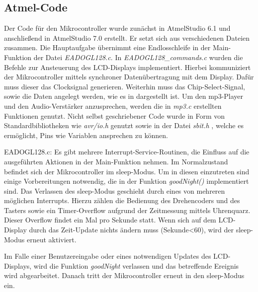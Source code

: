 \documentclass[journal, a4paper]{IEEEtran}
\begin{document}
	\subsection{Atmel-Code}
	\label{sc:Software:subsc:Atmel-Code}
	Der Code für den Mikrocontroller wurde zunächst in AtmelStudio 6.1 und anschließend in AtmelStudio 7.0 erstellt. Er setzt sich aus verschiedenen Dateien zusammen. Die Hauptaufgabe übernimmt eine Endlosschleife in der Main-Funktion der Datei \emph{EADOGL128.c}. In \emph{EADOGL128\_commands.c} wurden die Befehle zur Ansteuerung des LCD-Displays implementiert. Hierbei kommuniziert der Mikrocontroller mittels synchroner Datenübertragung mit dem Display. Dafür muss dieser das Clocksignal generieren. Weiterhin muss das Chip-Select-Signal, sowie die Daten angelegt werden, wie es in \cite{EADOG} dargestellt ist. Um den mp3-Player und den Audio-Verstärker anzusprechen, werden die in \emph{mp3.c} erstellten Funktionen genutzt. Nicht selbst geschriebener Code wurde in Form von Standardbibliotheken wie \emph{avr/io.h} genutzt sowie in der Datei \emph{sbit.h} \cite{sbit}, welche es ermöglicht, Pins wie Variablen ansprechen zu können.
	
	EADOGL128.c:
	Es gibt mehrere Interrupt-Service-Routinen, die Einfluss auf die ausgeführten Aktionen in der Main-Funktion nehmen. Im Normalzustand befindet sich der Mikrocontroller im sleep-Modus. Um in diesen einzutreten sind einige Vorbereitungen notwendig, die in der Funktion \emph{goodNight()} implementiert sind. Das Verlassen des sleep-Modus geschieht durch eines von mehreren möglichen Interrupts. Hierzu zählen die Bedienung des Drehencoders und des Tasters sowie ein Timer-Overflow aufgrund der Zeitmessung mittels Uhrenquarz. Dieser Overflow findet ein Mal pro Sekunde statt. Wenn sich auf dem LCD-Display durch das Zeit-Update nichts ändern muss (Sekunde<60), wird der sleep-Modus erneut aktiviert. \par
	Im Falle einer Benutzereingabe oder eines notwendigen Updates des LCD-Displays, wird die Funktion \emph{goodNight} verlassen und das betreffende Ereignis wird abgearbeitet. Danach tritt der Mikrocontroller erneut in den sleep-Modus ein.
	
\end{document}

